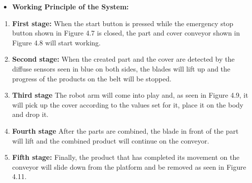 \begin{itemize}
    \item \textbf{Working Principle of the System:} 
\end{itemize}

\begin{enumerate}
    \item \textbf{}\textbf{First stage:} When the start button is pressed while the emergency stop button shown in Figure 4.7 is closed, the part and cover conveyor shown in Figure 4.8 will start working.
    \item \textbf{} \textbf{Second stage:} When the created part and the cover are detected by the diffuse sensors seen in blue on both sides, the blades will lift up and the progress of the products on the belt will be stopped.
    \item \textbf{} \textbf{Third stage} The robot arm will come into play and, as seen in Figure 4.9, it will pick up the cover according to the values ​​set for it, place it on the body and drop it.
    \item \textbf{} \textbf{Fourth stage} After the parts are combined, the blade in front of the part will lift and the combined product will continue on the conveyor.
    \item \textbf{} \textbf{Fifth stage:} Finally, the product that has completed its movement on the conveyor will slide down from the platform and be removed as seen in Figure 4.11.
\end{enumerate}

